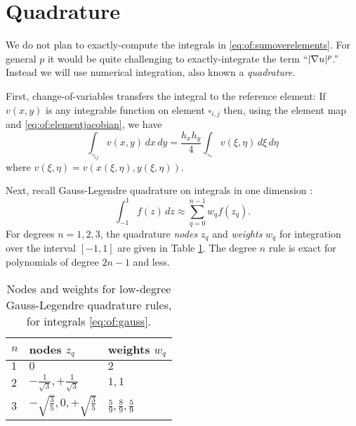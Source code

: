 \section{Quadrature}

We do not plan to exactly-compute the integrals in \eqref{eq:of:sumoverelements}.  For general $p$ it would be quite challenging to exactly-integrate the term ``$|\nabla u|^p$.''  Instead we will use numerical integration, also known a \emph{quadrature}.

First, change-of-variables transfers the integral to the reference element: If $v(x,y)$ is any integrable function on element $\square_{i,j}$ then, using the element map and \eqref{eq:of:elementjacobian}, we have
\begin{equation}
\int_{\square_{ij}} v(x,y)\,dx\,dy = \frac{h_x h_y}{4} \int_{\square_\ast} v(\xi,\eta) \,d\xi\,d\eta \label{eq:of:changeofvars}
\end{equation}
where $v(\xi,\eta)=v(x(\xi,\eta),y(\xi,\eta))$.

Next, recall Gauss-Legendre quadrature on integrals in one dimension \citep{GreenbaumChartier2012}:
\begin{equation}
\int_{-1}^1 f(z)\,dz \approx \sum_{q=0}^{n-1} w_q f(z_q).  \label{eq:of:gauss}
\end{equation}
For degrees $n=1,2,3$, the quadrature \emph{nodes} $z_q$ and \emph{weights} $w_q$ for integration over the interval $[-1,1]$ are given in Table \ref{tab:of:gauss}.  The degree $n$ rule is exact for polynomials of degree $2n-1$ and less.

\begin{table}[h]
\vspace{0.1in}

\begin{tabular}{lll}
$n$\phantom{foobar} & nodes $z_q$\phantom{foo} & weights $w_q$ \\ \hline
$1$ & $0$ & $2$ \\
$2$ & $-\frac{1}{\sqrt{3}}, +\frac{1}{\sqrt{3}}$ & $1,1$ \\
$3$ & $-\sqrt{\frac{3}{5}}, 0, +\sqrt{\frac{3}{5}}$ & $\frac{5}{9}, \frac{8}{9}, \frac{5}{9}$ \\
\end{tabular}

\vspace{0.1in}
\caption{Nodes and weights for low-degree Gauss-Legendre quadrature rules, for integrals \eqref{eq:of:gauss}.} \label{tab:of:gauss}
\end{table}

